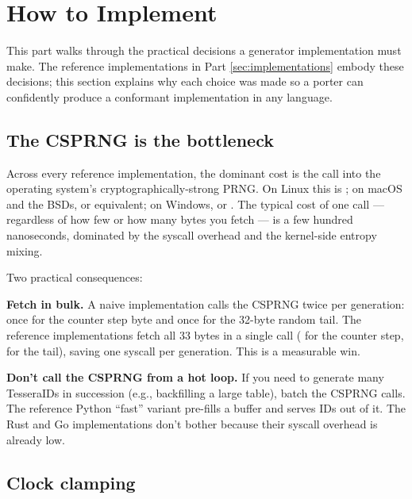 \section{How to Implement}
\label{sec:how}

This part walks through the practical decisions a generator implementation must make. The reference implementations in Part \ref{sec:implementations} embody these decisions; this section explains why each choice was made so a porter can confidently produce a conformant implementation in any language.

\subsection{The CSPRNG is the bottleneck}

Across every reference implementation, the dominant cost is the call into the operating system's cryptographically-strong PRNG. On Linux this is ; on macOS and the BSDs,  or equivalent; on Windows,  or . The typical cost of one call --- regardless of how few or how many bytes you fetch --- is a few hundred nanoseconds, dominated by the syscall overhead and the kernel-side entropy mixing.

Two practical consequences:

\textbf{Fetch in bulk.} A naive implementation calls the CSPRNG twice per generation: once for the counter step byte and once for the 32-byte random tail. The reference implementations fetch all 33 bytes in a single call ( for the counter step,  for the tail), saving one syscall per generation. This is a measurable win.

\textbf{Don't call the CSPRNG from a hot loop.} If you need to generate many TesseraIDs in succession (e.g., backfilling a large table), batch the CSPRNG calls. The reference Python ``fast'' variant pre-fills a buffer and serves IDs out of it. The Rust and Go implementations don't bother because their syscall overhead is already low.

\subsection{Clock clamping}

